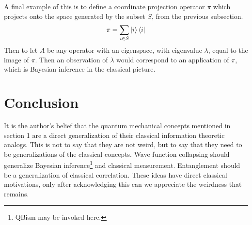 \documentclass[12pt,a4paper]{article}
\begin{document}
A final example of this is to define a coordinate projection operator $\pi$ which projects onto the space generated by the subset $S$, from the previous subsection.
\[
\pi = \sum_{i \in S} \ket{i} \bra{i}
\]
Then to let $A$ be any operator with an eigenspace, with eigenvalue $\lambda$, equal to the image of $\pi$.  Then an observation of $\lambda$ would correspond to an application of $\pi$, which is Bayesian inference in the classical picture.

\section{Conclusion}

It is the author's belief that the quantum mechanical concepts mentioned in section 1 are a direct generalization of their classical information theoretic analogs.  This is not to say that they are not weird, but to say that they need to be generalizations of the classical concepts.  Wave function collapsing should generalize Bayesian inference\footnote{QBism may be invoked here.} and classical measurement.  Entanglement should be a generalization of classical correlation.  These ideas have direct classical motivations, only after acknowledging this can we appreciate the weirdness that remains.



\end{document}
